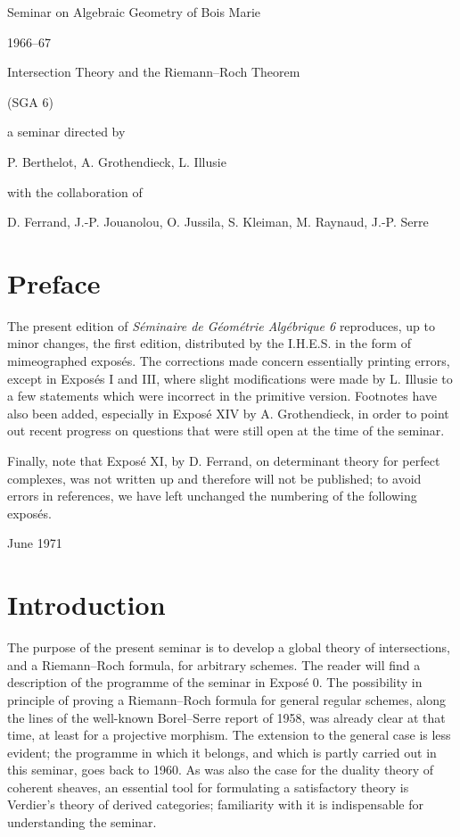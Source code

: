 \documentclass[11pt]{article}
\begin{document}
\begin{center}
{\Large Seminar on Algebraic Geometry of Bois Marie}\par
{\large 1966--67}\par
\vspace{1.5em}
{\Large Intersection Theory and the Riemann--Roch Theorem}\par
{\large (SGA 6)}\par
\vspace{1.5em}
a seminar directed by\par
P. Berthelot, A. Grothendieck, L. Illusie\par
with the collaboration of\par
D. Ferrand, J.-P. Jouanolou, O. Jussila, S. Kleiman, M. Raynaud, J.-P. Serre
\end{center}

\section*{Preface}
The present edition of \emph{Séminaire de Géométrie Algébrique 6} reproduces, up to minor changes, the first edition, distributed by the I.H.E.S. in the form of mimeographed exposés. The corrections made concern essentially printing errors, except in Exposés I and III, where slight modifications were made by L. Illusie to a few statements which were incorrect in the primitive version. Footnotes have also been added, especially in Exposé XIV by A. Grothendieck, in order to point out recent progress on questions that were still open at the time of the seminar.

Finally, note that Exposé XI, by D. Ferrand, on determinant theory for perfect complexes, was not written up and therefore will not be published; to avoid errors in references, we have left unchanged the numbering of the following exposés.

\begin{flushright}June 1971\end{flushright}

\section*{Introduction}
The purpose of the present seminar is to develop a global theory of intersections, and a Riemann--Roch formula, for arbitrary schemes. The reader will find a description of the programme of the seminar in Exposé 0. The possibility in principle of proving a Riemann--Roch formula for general regular schemes, along the lines of the well-known Borel--Serre report of 1958, was already clear at that time, at least for a projective morphism. The extension to the general case is less evident; the programme in which it belongs, and which is partly carried out in this seminar, goes back to 1960. As was also the case for the duality theory of coherent sheaves, an essential tool for formulating a satisfactory theory is Verdier's theory of derived categories; familiarity with it is indispensable for understanding the seminar.
\end{document}
